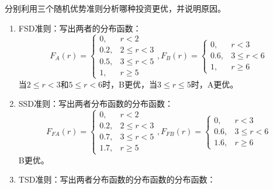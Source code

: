 \begin{enumerate}
    \begin{center}
    \end{center}
    分别利用三个随机优势准则分析哪种投资更优，并说明原因。\\
    \sol
    \begin{enumerate}[label=(\arabic*)]
        \item FSD准则：写出两者的分布函数：
        \[F_A(r)=\begin{cases}
            0, & r < 2\\
            0.2, & 2 \leqslant r < 3\\
            0.5, & 3 \leqslant r < 5\\
            1, & r \geqslant 5
        \end{cases},F_B(r)=\begin{cases}
            0, & r < 3\\
            0.6, & 3 \leqslant r < 6\\
            1, & r \geqslant 6
        \end{cases}\]
        当$2 \leqslant r<3$和$5 \leqslant r < 6$时，B更优，当$3 \leqslant r \leqslant 5$时，A更优。
        \item SSD准则：写出两者分布函数的分布函数：
        \[F_{FA}(r)=\begin{cases}
            0, & r < 2\\
            0.2, & 2 \leqslant r < 3\\
            0.7, & 3 \leqslant r < 5\\
            1.7, & r \geqslant 5
        \end{cases},F_{FB}(r)=\begin{cases}
            0, & r < 3\\
            0.6, & 3 \leqslant r < 6\\
            1.6, & r \geqslant 6
        \end{cases}\]
        B更优。
        \item TSD准则：写出两者分布函数的分布函数的分布函数：

\end{enumerate}
\end{enumerate}
